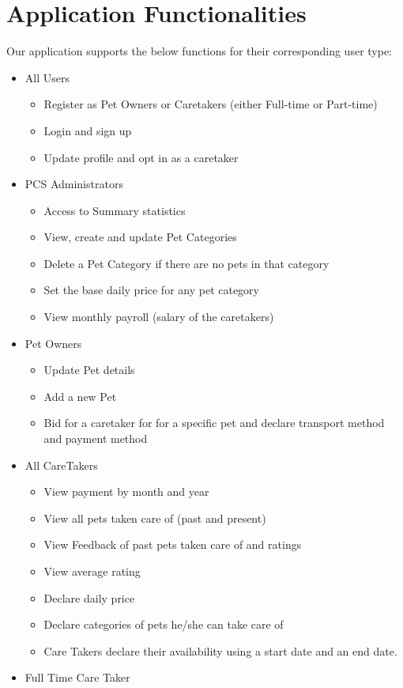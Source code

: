 \documentclass[
  paper=a4,
  ,captions=tableheading
]{scrartcl}
\providecommand{\tightlist}{%
  \setlength{\itemsep}{0pt}\setlength{\parskip}{0pt}}
\begin{document}
\hypertarget{application-functionalities}{%
\section{Application
Functionalities}\label{application-functionalities}}

Our application supports the below functions for their corresponding
user type:

\begin{itemize}
\item
  All Users

  \begin{itemize}
  \tightlist
  \item
    Register as Pet Owners or Caretakers (either Full-time or Part-time)
  \item
    Login and sign up
  \item
    Update profile and opt in as a caretaker
  \end{itemize}
\item
  PCS Administrators

  \begin{itemize}
  \tightlist
  \item
    Access to Summary statistics
  \item
    View, create and update Pet Categories
  \item
    Delete a Pet Category if there are no pets in that category
  \item
    Set the base daily price for any pet category
  \item
    View monthly payroll (salary of the caretakers)
  \end{itemize}
\item
  Pet Owners

  \begin{itemize}
  \tightlist
  \item
    Update Pet details
  \item
    Add a new Pet
  \item
    Bid for a caretaker for for a specific pet and declare transport
    method and payment method
  \end{itemize}
\item
  All CareTakers

  \begin{itemize}
  \tightlist
  \item
    View payment by month and year
  \item
    View all pets taken care of (past and present)
  \item
    View Feedback of past pets taken care of and ratings
  \item
    View average rating
  \item
    Declare daily price
  \item
    Declare categories of pets he/she can take care of
  \item
    Care Takers declare their availability using a start date and an end
    date.
  \end{itemize}
\item
  Full Time Care Taker


\end{itemize}
\end{document}
